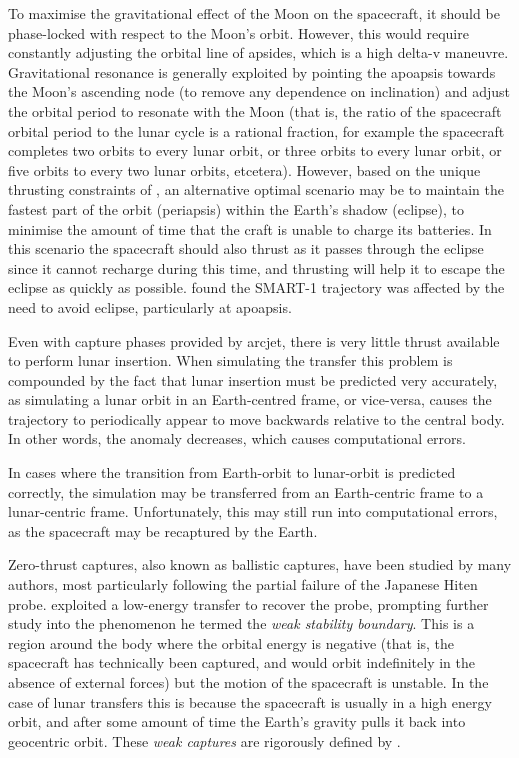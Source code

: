 To maximise the gravitational effect of the Moon on the spacecraft, it should be phase-locked with respect to the Moon's orbit. However, this would require constantly adjusting the orbital line of apsides, which is a high delta-v maneuvre. Gravitational resonance is generally exploited by pointing the apoapsis towards the Moon's ascending node (to remove any dependence on inclination) and adjust the orbital period to resonate with the Moon (that is, the ratio of the spacecraft orbital period to the lunar cycle is a rational fraction, for example the spacecraft completes two orbits to every lunar orbit, or three orbits to every lunar orbit, or five orbits to every two lunar orbits, etcetera). However, based on the unique thrusting constraints of \BW, an alternative optimal scenario may be to maintain the fastest part of the orbit (periapsis) within the Earth's shadow (eclipse), to minimise the amount of time that the craft is unable to charge its batteries. In this scenario the spacecraft should also thrust as it passes through the eclipse since it cannot recharge during this time, and thrusting will help it to escape the eclipse as quickly as possible. \textcite{Racca9} found the SMART-1 trajectory was affected by the need to avoid eclipse, particularly at apoapsis.

Even with capture phases provided by arcjet, there is very little thrust available to perform lunar insertion. When simulating the transfer this problem is compounded by the fact that lunar insertion must be predicted very accurately, as simulating a lunar orbit in an Earth-centred frame, or vice-versa, causes the trajectory to periodically appear to move backwards relative to the central body. In other words, the anomaly decreases, which causes computational errors.

In cases where the transition from Earth-orbit to lunar-orbit is predicted correctly, the simulation may be transferred from an Earth-centric frame to a lunar-centric frame. Unfortunately, this may still run into computational errors, as the spacecraft may be recaptured by the Earth.

Zero-thrust captures, also known as ballistic captures, have been studied by many authors, most particularly \textcite{Belbruno1993} following the partial failure of the Japanese Hiten probe. \citeauthor{Belbruno2004} exploited a low-energy transfer to recover the probe, prompting further study into the phenomenon he termed the \emph{weak stability boundary}. This is a region around the body where the orbital energy is negative (that is, the spacecraft has technically been captured, and would orbit indefinitely in the absence of external forces) but the motion of the spacecraft is unstable. In the case of lunar transfers this is because the spacecraft is usually in a high energy orbit, and after some amount of time the Earth's gravity pulls it back into geocentric orbit. These \emph{weak captures} are rigorously defined by \textcite{Belbruno2004}.

